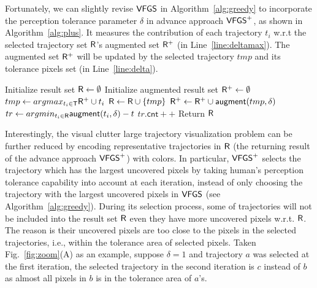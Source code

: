Fortunately, we can slightly revise $\mathsf{VFGS}$ in Algorithm~\ref{alg:greedy} to incorporate the perception tolerance parameter $\delta$ in advance approach $\mathsf{VFGS}^{+}$, as shown in Algorithm~\ref{alg:plus}.
It measures the contribution of each trajectory $t_i$ w.r.t the selected trajectory set $\mathsf{R}$'s augmented set $\mathsf{R}^{+}$ (in Line~\ref{line:deltamax}).
The augmented set $\mathsf{R}^{+}$ will be updated by the selected trajectory $tmp$ and its tolerance pixels set (in Line~\ref{line:delta}).

\vspace{-2mm}
\begin{algorithm}
    \caption{$\avats(\D,k=\alpha |\D|,\delta)$} \label{alg:plus}
    \begin{algorithmic}[1]
    \State Initialize result set $\mathsf{R} \leftarrow \emptyset$
    \State Initialize augmented result set $\mathsf{R}^{+} \leftarrow \emptyset$
        \State $tmp \leftarrow argmax_{t_i \in \mathsf{T}} \mathsf{R}^{+} \cup t_i$ \label{line:deltamax}
        \State $\mathsf{R} \leftarrow \mathsf{R} \cup \{ tmp \}$
        \State $\mathsf{R}^{+} \leftarrow \mathsf{R}^{+} \cup \mathsf{augment}(tmp, \delta)$\label{line:delta}
    \EndWhile
      \label{line:s}
        \State $tr \leftarrow argmin_{t_i \in \mathsf{R}}{\mathsf{augment}(t_i, \delta) - t}$
        \State $tr.\mathsf{cnt}++$ \label{line:e}
    \EndFor
    \State Return $\mathsf{R}$
    \end{algorithmic}
\end{algorithm}
\vspace{-2mm}

Interestingly, the visual clutter large trajectory visualization problem can be further reduced
by encoding representative trajectories in $\mathsf{R}$ (the returning result of the advance approach $\mathsf{VFGS}^{+}$) with colors.
In particular, $\mathsf{VFGS}^{+}$ selects the trajectory which has the largest uncovered pixels by taking human's perception tolerance capability into account at each iteration,
instead of only choosing the trajectory with the largest uncovered pixels in $\mathsf{VFGS}$ (see Algorithm~\ref{alg:greedy}).
During its selection process, some of trajectories will not be included into the result set $\mathsf{R}$ even they have more uncovered pixels w.r.t. $\mathsf{R}$.
The reason is their uncovered pixels are too close to the pixels in the selected trajectories, i.e., within the tolerance area of selected pixels.
Taken Fig.~\ref{fig:zoom}(A) as an example, suppose $\delta=1$ and trajectory $a$ was selected at the first iteration,
the selected trajectory in the second iteration is $c$ instead of $b$ as almost all pixels in $b$ is in the tolerance area of $a$'s.


